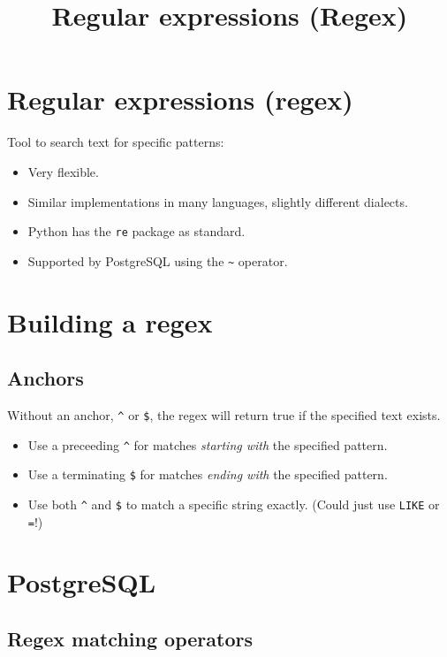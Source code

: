 \documentclass[slides]{pgnotes}
\title{Regular expressions (Regex)}
\begin{document}
\maketitle

\section{Regular expressions (regex)}\label{regex}

Tool to search text for specific patterns:
\begin{itemize}
\item Very flexible.
\item Similar implementations in many languages, slightly different dialects.
\item Python has the \texttt{re} package as standard.
\item Supported by PostgreSQL using the \texttt{\textasciitilde{}} operator.
\end{itemize}
  
\section{Building a regex}\label{building-a-regex}

\subsection{Anchors}\label{anchors}

Without an anchor, \texttt{\^{}} or \texttt{\$}, the regex will return true if the specified text exists.

\begin{itemize}
\item Use a preceeding \texttt{\^{}} for matches \emph{starting with} the specified pattern.
\item Use a terminating \texttt{\$} for matches \emph{ending with} the specified pattern.
\item Use both \texttt{\^{}} and \texttt{\$} to match a specific string exactly. (Could just use \texttt{LIKE} or \texttt{=}!)
\end{itemize}

\section{PostgreSQL}\label{postgresql}

\subsection{Regex matching operators}\label{regex-matching-operators}
\end{document}
